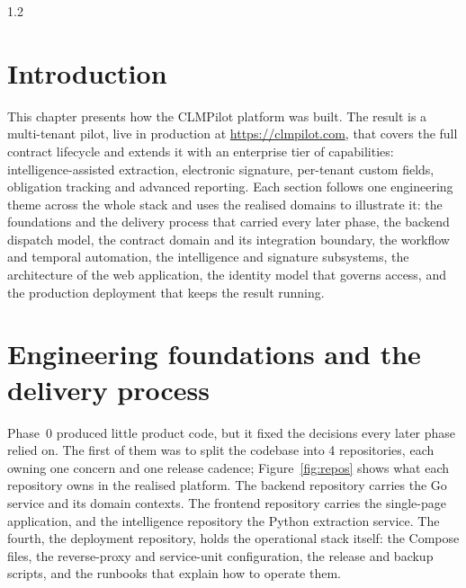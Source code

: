 \begin{spacing}{1.2}

\section*{Introduction}
This chapter presents how the CLMPilot platform was built. The result is
a multi-tenant pilot, live in production at \url{https://clmpilot.com},
that covers the full contract lifecycle and extends it with an
enterprise tier of capabilities: intelligence-assisted extraction,
electronic signature, per-tenant custom fields, obligation tracking and
advanced reporting. Each section follows one engineering theme across
the whole stack and uses the realised domains to illustrate it: the
foundations and the delivery process that carried every later phase, the
backend dispatch model, the contract domain and its integration
boundary, the workflow and temporal automation, the intelligence and
signature subsystems, the architecture of the web application, the
identity model that governs access, and the production deployment that
keeps the result running. 
\vspace{1cm}
\section{Engineering foundations and the delivery process}
\label{sec:found}

Phase~0 produced little product code, but it fixed the decisions every
later phase relied on. The first of them was to split the codebase into 4
repositories, each owning one concern and one release cadence;
Figure~\ref{fig:repos} shows what each repository owns in the realised
platform. The backend repository carries the Go service and its domain
contexts. The frontend repository carries the single-page
application, and the intelligence repository the Python extraction
service. The fourth, the deployment repository, holds the operational
stack itself: the Compose files, the reverse-proxy and service-unit
configuration, the release and backup scripts, and the runbooks that
explain how to operate them.


\end{spacing}
